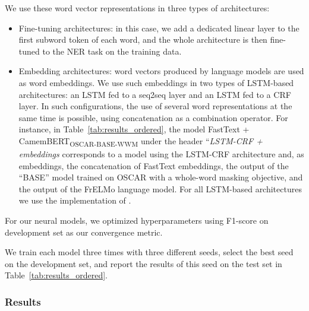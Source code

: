 We use these word vector representations in three types of architectures:
\begin{itemize}
    \item Fine-tuning architectures: in this case, we add a dedicated linear layer to the first subword token of each word, and the whole architecture is then fine-tuned to the NER task on the training data.
    \item Embedding architectures: word vectors produced by language models are used as word embeddings. We use such embeddings in two types of LSTM-based architectures: an LSTM fed to a seq2seq layer and an LSTM fed to a CRF layer. In such configurations, the use of several word representations at the same time is possible, using concatenation as a combination operator. For instance, in Table~\ref{tab:results_ordered}, the model FastText + CamemBERT\textsubscript{OSCAR-BASE-WWM} under the header ``\emph{LSTM-CRF + embeddings} corresponds to a model using the LSTM-CRF architecture and, as embeddings, the concatenation of FastText embeddings, the output of the \camembert ``BASE'' model trained on OSCAR with a whole-word masking objective, and the output of the FrELMo language model. For all LSTM-based architectures we use the implementation of \citet{strakova-etal-2019-neural}.
\end{itemize}

For our neural models, we optimized hyperparameters using F1-score on development set as our convergence metric.

We train each model three times with three different seeds, select the best seed on the development set, and report the results of this seed on the test set in Table~\ref{tab:results_ordered}.

\subsubsection{Results}

